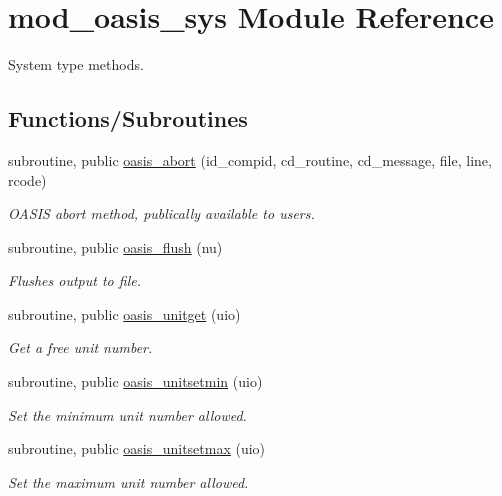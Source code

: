 \hypertarget{namespacemod__oasis__sys}{}\section{mod\+\_\+oasis\+\_\+sys Module Reference}
\label{namespacemod__oasis__sys}


System type methods.  


\subsection*{Functions/\+Subroutines}
\begin{DoxyCompactItemize}
\item 
subroutine, public \hyperlink{namespacemod__oasis__sys_af1943a0ce0c5765ba8a714379065464f}{oasis\+\_\+abort} (id\+\_\+compid, cd\+\_\+routine, cd\+\_\+message, file, line, rcode)
\begin{DoxyCompactList}\small\item\em O\+A\+S\+IS abort method, publically available to users. \end{DoxyCompactList}\item 
subroutine, public \hyperlink{namespacemod__oasis__sys_ad152b6f737a7e06f8f1226af23d66361}{oasis\+\_\+flush} (nu)
\begin{DoxyCompactList}\small\item\em Flushes output to file. \end{DoxyCompactList}\item 
subroutine, public \hyperlink{namespacemod__oasis__sys_abce4c06d8a999919a2a185c71ab15edd}{oasis\+\_\+unitget} (uio)
\begin{DoxyCompactList}\small\item\em Get a free unit number. \end{DoxyCompactList}\item 
subroutine, public \hyperlink{namespacemod__oasis__sys_a063a41b73546564afd294fd5708b6667}{oasis\+\_\+unitsetmin} (uio)
\begin{DoxyCompactList}\small\item\em Set the minimum unit number allowed. \end{DoxyCompactList}\item 
subroutine, public \hyperlink{namespacemod__oasis__sys_a6e0a46b41f1b9f0a1dc99b17665f49dc}{oasis\+\_\+unitsetmax} (uio)
\begin{DoxyCompactList}\small\item\em Set the maximum unit number allowed. \end{DoxyCompactList}\item 

\end{DoxyCompactItemize}

